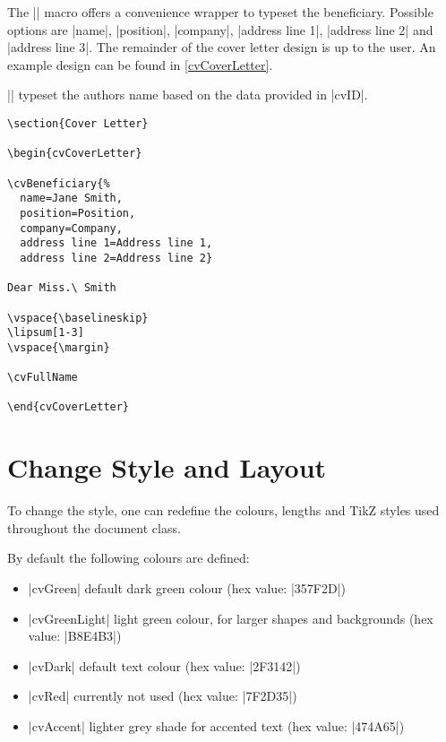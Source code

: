 \documentclass{ltxdoc}
\begin{document}
  \DescribeMacro{\cvBeneficiary}
  The || macro offers a convenience wrapper to typeset the beneficiary. Possible options are |name|, |position|, |company|, |address line 1|, |address line 2| and |address line 3|. The remainder of the cover letter design is up to the user. An example design can be found in \cref{cvCoverLetter}.
  
  \DescribeMacro{\cvFullName}
  |\cvFullName| typeset the authors name based on the data provided in |cvID|. 

  \begin{lstlisting}[caption={\lstinline!cvCoverLetter! code example.},label=cvCoverLetter]
\section{Cover Letter}

\begin{cvCoverLetter}

\cvBeneficiary{%
  name=Jane Smith,
  position=Position,
  company=Company,
  address line 1=Address line 1,
  address line 2=Address line 2}

Dear Miss.\ Smith

\vspace{\baselineskip}
\lipsum[1-3]
\vspace{\margin}

\cvFullName

\end{cvCoverLetter}
  \end{lstlisting}

\section{Change Style and Layout}

  To change the style, one can redefine the colours, lengths and TikZ styles used throughout the document class.

  By default the following colours are defined:
  \begin{itemize}
    \item |cvGreen| default dark green colour (hex value: {\color{cvGreen} |357F2D|})
    \item |cvGreenLight| light green colour, for larger shapes and backgrounds (hex value: {\color{cvGreenLight} |B8E4B3|})
    \item |cvDark| default text colour (hex value: {\color{cvDark} |2F3142|})
    \item |cvRed| currently not used (hex value: {\color{cvRed} |7F2D35|})
    \item |cvAccent| lighter grey shade for accented text (hex value: {\color{cvAccent} |474A65|})
  \end{itemize}
  
\end{document}
